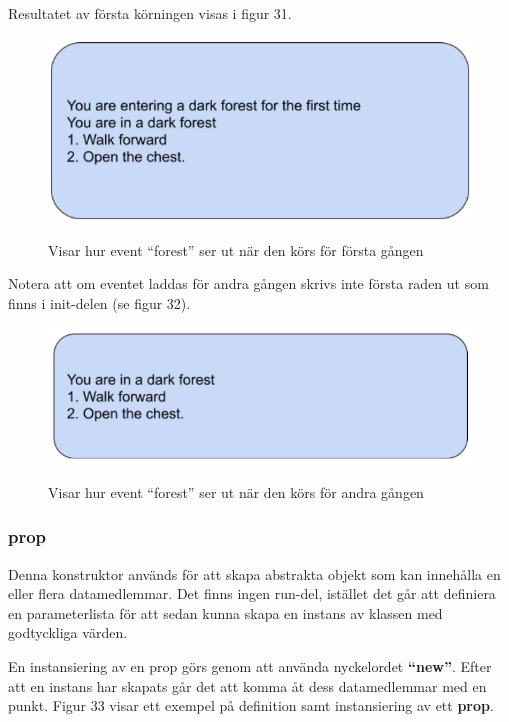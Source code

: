 \documentclass{Dokumentmall}
\begin{document}
Resultatet av första körningen visas i figur 31.

\begin{figure}[h!]
  \centering
  \includegraphics[scale = 0.65]{Images/Figur31.png}
  \label{}
  \caption{Visar hur event ``forest'' ser ut när den körs för första gången}
\end{figure}

\newpage
Notera att om eventet laddas för andra gången skrivs inte första raden ut som finns i init-delen (se figur 32).

\begin{figure}[h!]
  \centering
  \includegraphics[scale = 0.65]{Images/Figur32.png}
  \label{}
  \caption{Visar hur event ``forest'' ser ut när den körs för andra gången}
\end{figure}

\newpage
\subsubsection{prop}
Denna konstruktor används för att skapa abstrakta objekt som kan innehålla en eller flera datamedlemmar. Det finns ingen run-del, istället det går att definiera en parameterlista för att sedan kunna skapa en instans av klassen med godtyckliga värden.


En instansiering av en prop görs genom att använda nyckelordet \textbf{``new''}. Efter att en instans har skapats går det att komma åt dess datamedlemmar med en punkt. Figur 33 visar ett exempel på definition samt instansiering av ett \textbf{prop}.
\end{document}
